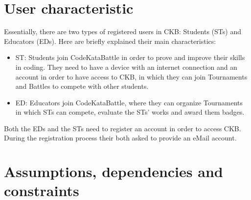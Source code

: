 \section{User characteristic}
\label{sec:user_characteristic}%
Essentially, there are two types of registered users in CKB: Students (STs) and Educators (EDs). Here are briefly explained their main characteristics:
\begin{itemize}
    \item ST: Students join CodeKataBattle in order to prove and improve their skills in coding. They need to have a device with an internet connection and an account in order to have access to CKB, in which they can join Tournaments and Battles to compete with other students.  
    \item ED: Educators join CodeKataBattle, where they can organize Tournaments in which STs can compete, evaluate the STs’ works and award them badges. 
\end{itemize}
Both the EDs and the STs need to register an account in order to access CKB. During the registration process their both asked to provide an eMail account.
\section{Assumptions, dependencies and constraints}
\label{sec:assumptions_dependencies_constraints}%

